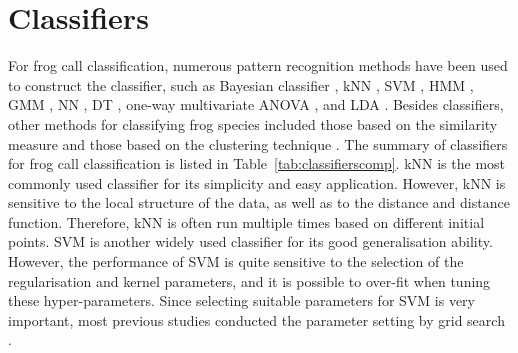 \section{Classifiers}
\label{classifiers}
For frog call classification, numerous pattern recognition methods have been used to construct the classifier, such as Bayesian classifier \citep{Brandes2006}, kNN \citep{ huang2008realization,huang2009frog, han2011acoustic, dayou2011classification, jaafar2013mfcc, Gingras2013, jaafar2013mfcc,jaafarcomparative, yuan2012frog, vaca2010using, feature2012Colona}, SVM \citep{huang2008realization,acevedo2009automated, huang2009frog, tanintelligent2014, Gingras2013,jaafarcomparative}, HMM \citep{brandes2008feature}, GMM \citep{huang2008realization, Gingras2013}, NN \citep{Huang20141, yen2002automatic}, DT \citep{grigg1996monitoring, acevedo2009automated}, one-way multivariate ANOVA \citep{camacho2013automatic}, and LDA \citep{acevedo2009automated,lee2006automatic}. Besides classifiers, other methods for classifying frog species included those based on the similarity measure \citep{croker2012using, dang2008lightweight, chen2012automatic} and those based on the clustering technique \citep{colombia2009frogs, wei2012distributed, bedoya2014automatic}. The summary of classifiers for frog call classification is listed in Table~\ref{tab:classifierscomp}.
kNN is the most commonly used classifier for its simplicity and easy application. However, kNN is sensitive to the local structure of the data, as well as to the distance and distance function. Therefore, kNN is often run multiple times based on different initial points. 
SVM is another widely used classifier for its good generalisation ability. However, the performance of SVM is quite sensitive to the selection of the regularisation and kernel parameters, and it is possible to over-fit when tuning these hyper-parameters. Since selecting suitable parameters for SVM is very important, most previous studies conducted the parameter setting by grid search  \citep{hsu2003practical}.

